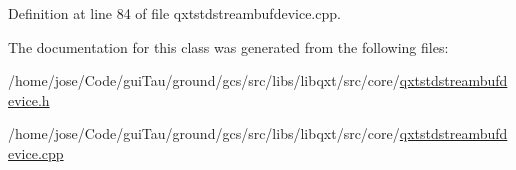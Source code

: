 Definition at line 84 of file qxtstdstreambufdevice.\-cpp.



The documentation for this class was generated from the following files\-:\begin{DoxyCompactItemize}
\item 
/home/jose/\-Code/gui\-Tau/ground/gcs/src/libs/libqxt/src/core/\hyperlink{qxtstdstreambufdevice_8h}{qxtstdstreambufdevice.\-h}\item 
/home/jose/\-Code/gui\-Tau/ground/gcs/src/libs/libqxt/src/core/\hyperlink{qxtstdstreambufdevice_8cpp}{qxtstdstreambufdevice.\-cpp}\end{DoxyCompactItemize}
